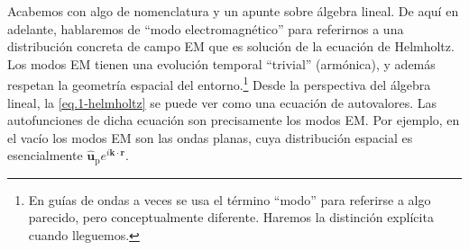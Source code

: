 Acabemos con algo de nomenclatura y un apunte sobre álgebra lineal. De aquí en adelante, hablaremos de ``modo electromagnético'' para referirnos a una distribución concreta de campo EM que es solución de la ecuación de Helmholtz. Los modos EM tienen una evolución temporal ``trivial'' (armónica), y además respetan la geometría espacial del entorno.\footnote{En guías de ondas a veces se usa el término ``modo'' para referirse a algo parecido, pero conceptualmente diferente. Haremos la distinción explícita cuando lleguemos.} Desde la perspectiva del álgebra lineal, la \cref{eq.1-helmholtz} se puede ver como una ecuación de autovalores. Las autofunciones de dicha ecuación son precisamente los modos EM. Por ejemplo, en el vacío los modos EM son las ondas planas, cuya distribución espacial es esencialmente \(\hat{\mathbf{u}}_\mathrm{p}e^{i\mathbf{k}\cdot\mathbf{r}}\).

